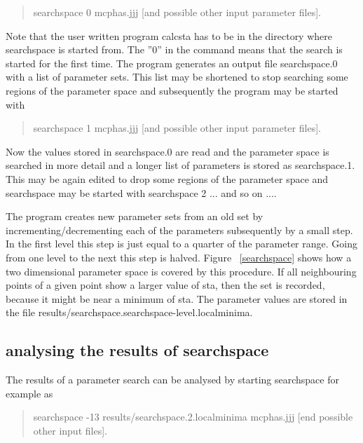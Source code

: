 \begin{quote}
 {\prg searchspace 0 mcphas.jjj [and possible other input parameter files]}.
\end{quote}


Note that the user written program {\prg calcsta} has to be in the
directory where {\prg searchspace} is started from.
The ''0'' in the command means that the search is started for the first time.
The program generates an output file {\prg searchspace.0} with a list
of parameter sets. This list may be shortened to stop searching 
some regions of the parameter space and subsequently the program may be started
with

\begin{quote}
 {\prg searchspace 1 mcphas.jjj [and possible other input parameter files]}.
\end{quote}


Now the values stored in {\prg searchspace.0} are read and 
the parameter space is searched in more detail and a longer list 
of parameters is stored as {\prg searchspace.1}. This may be again
edited to drop some regions of the parameter space and {\prg searchspace}
may be started with {\prg searchspace 2 ...} and so on ....

The program creates new parameter sets from an old set by incrementing/decrementing
each of the parameters subsequently by a small step. In the first level this step
is just equal to a quarter of the parameter range. Going from one level to
 the next this step is halved. Figure ~\ref{searchspace} shows how a two dimensional
 parameter space is covered by this procedure. If all neighbouring points of
 a given point show a larger value of {\prg sta}, then the set is recorded, because it might be
 near a minimum of {\prg sta}. The parameter values are stored in the file
 {\prg results/searchspace.searchspace-level.localminima}.

\subsection{analysing the results of {\prg searchspace}}

The results of a parameter search can be analysed by starting searchspace for example as

\begin{quote}
{\prg searchspace -13 results/searchspace.2.localminima mcphas.jjj [end possible other input files]}.
\end{quote}

